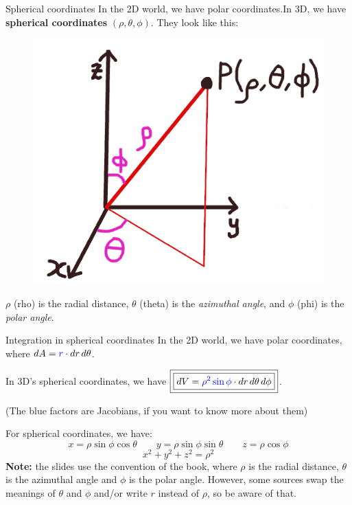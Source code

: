 \begin{frame}{Spherical coordinates}
    In the 2D world, we have polar coordinates.\pause In 3D, we have \textbf{spherical coordinates} $(\rho,\theta,\phi)$.
    They look like this:
    \begin{figure}[b]\includegraphics[scale=1.3]{sph}\centering\end{figure}
        $\rho$ (rho) is the radial distance, $\theta$ (theta) is the \textit{azimuthal angle}, and $\phi$ (phi) is the \textit{polar angle}.
\end{frame}

\begin{frame}{Integration in spherical coordinates}
    In the 2D world, we have polar coordinates, where $dA=\textcolor{blue}{r}\cdot dr\,d\theta$.

    \pause In 3D's spherical coordinates, we have $\boxed{\boxed{dV=\textcolor{blue}{\rho^2\sin\phi}\cdot dr\,d\theta \,d\phi}}$.

    {\scriptsize(The blue factors are Jacobians, if you want to know more about them)}

    \pause For spherical coordinates, we have:
        \[\boxed{x=\rho\sin\phi\cos\theta \qquad y=\rho\sin\phi\sin\theta \qquad z=\rho\cos\phi}\]
        \[\boxed{x^2+y^2+z^2=\rho^2}\]
    \pause\textbf{Note:} the slides use the convention of the book, where $\rho$ is the radial distance, $\theta$ is the azimuthal angle and $\phi$ is the polar angle. However, some sources swap the meanings of $\theta$ and $\phi$ and/or write $r$ instead of $\rho$, so be aware of that.
\end{frame}

